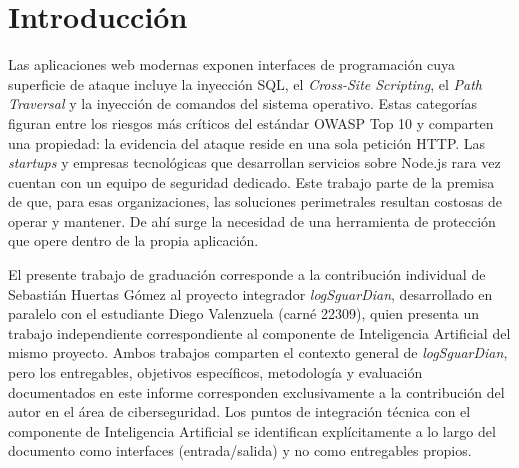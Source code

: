%
\ifdefined\modoensamble
\else
	
\fi

\setcounter{page}{1}
\chapter{Introducción}

Las aplicaciones web modernas exponen interfaces de programación cuya superficie de ataque incluye la inyección SQL, el \textit{Cross-Site Scripting}, el \textit{Path Traversal} y la inyección de comandos del sistema operativo. Estas categorías figuran entre los riesgos más críticos del estándar OWASP Top 10 \cite{owasp2021} y comparten una propiedad: la evidencia del ataque reside en una sola petición HTTP. Las \textit{startups} y empresas tecnológicas que desarrollan servicios sobre Node.js rara vez cuentan con un equipo de seguridad dedicado. Este trabajo parte de la premisa de que, para esas organizaciones, las soluciones perimetrales resultan costosas de operar y mantener. De ahí surge la necesidad de una herramienta de protección que opere dentro de la propia aplicación.

El presente trabajo de graduación corresponde a la contribución individual de Sebastián
Huertas Gómez al proyecto integrador \emph{logSguarDian}, desarrollado en paralelo con el
estudiante Diego Valenzuela (carné 22309), quien presenta un trabajo independiente
correspondiente al componente de Inteligencia Artificial del mismo proyecto. Ambos
trabajos comparten el contexto general de \emph{logSguarDian}, pero los entregables,
objetivos específicos, metodología y evaluación documentados en este informe corresponden
exclusivamente a la contribución del autor en el área de ciberseguridad. Los puntos de
integración técnica con el componente de Inteligencia Artificial se identifican
explícitamente a lo largo del documento como interfaces (entrada/salida) y no como
entregables propios.

